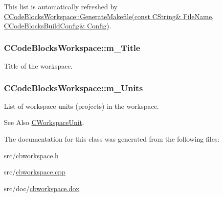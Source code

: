 This list is automatically refreshed by \hyperlink{classCCodeBlocksWorkspace_a2057d5876c3e450b04295066dcaef035}{C\-Code\-Blocks\-Workspace\-::\-Generate\-Makefile(const C\-String\& File\-Name, C\-Code\-Blocks\-Build\-Config\& Config)}. \hypertarget{classCCodeBlocksWorkspace_adbae0f57273b1e8e46b983859942476a}{
\subsubsection[{m\-\_\-\-Title}]{\setlength{\rightskip}{0pt plus 5cm}C\-Code\-Blocks\-Workspace\-::m\-\_\-\-Title\hspace{0.3cm}{\ttfamily [private]}}}\label{classCCodeBlocksWorkspace_adbae0f57273b1e8e46b983859942476a}


Title of the workspace. 

\hypertarget{classCCodeBlocksWorkspace_aa76c64684c8b462b93a7066477a8e8fc}{
\subsubsection[{m\-\_\-\-Units}]{\setlength{\rightskip}{0pt plus 5cm}C\-Code\-Blocks\-Workspace\-::m\-\_\-\-Units\hspace{0.3cm}{\ttfamily [private]}}}\label{classCCodeBlocksWorkspace_aa76c64684c8b462b93a7066477a8e8fc}


List of workspace units (projects) in the workspace. 

\begin{DoxySeeAlso}{See Also}
\hyperlink{classCWorkspaceUnit}{C\-Workspace\-Unit}. 
\end{DoxySeeAlso}


The documentation for this class was generated from the following files\-:\begin{DoxyCompactItemize}
\item 
src/\hyperlink{cbworkspace_8h}{cbworkspace.\-h}\item 
src/\hyperlink{cbworkspace_8cpp}{cbworkspace.\-cpp}\item 
src/doc/\hyperlink{cbworkspace_8dox}{cbworkspace.\-dox}\end{DoxyCompactItemize}
